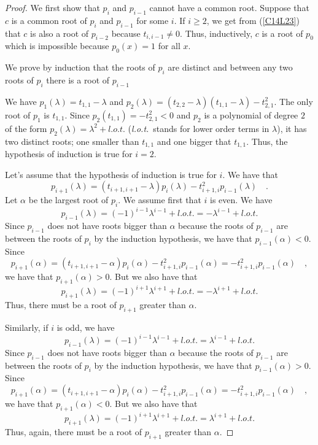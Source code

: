 \begin{proof}
 We first show that $p_i$ and $p_{i-1}$ cannot have a common
root.  Suppose that $c$ is a common root of $p_i$ and $p_{i-1}$ for
some $i$.  If $i\geq 2$, we get from (\ref{C14L23}) that $c$ is
also a root of $p_{i-2}$ because $t_{i,i-1} \neq 0$.  Thus,
inductively, $c$ is a root of $p_0$ which is impossible because
$p_0(x) = 1$ for all $x$.

 We prove by induction that the roots of $p_i$ are distinct
and between any two roots of $p_i$ there is a root of $p_{i-1}$

We have $p_1(\lambda) = t_{1,1} - \lambda$ and
$p_2(\lambda) = (t_{2,2}-\lambda)(t_{1,1}-\lambda) - t_{2,1}^2$.
The only root of $p_1$ is $t_{1,1}$.  Since
$p_2(t_{1,1}) = - t_{2,1}^2 < 0$ and $p_2$ is a polynomial of degree
$2$ of the form $p_2(\lambda) = \lambda^2 + l.o.t.$ ({\it l.o.t.}\
stands for lower order terms in $\lambda$), it has two distinct roots;
one smaller than $t_{1,1}$ and one bigger that $t_{1,1}$.   Thus, the
hypothesis of induction is true for $i=2$.

Let's assume that the hypothesis of induction is true for $i$.  We
have that
\[
  p_{i+1}(\lambda) = (t_{i+1,i+1}-\lambda) p_i(\lambda)
  - t_{i+1,i}^2 p_{i-1}(\lambda) \quad .
\]
Let $\alpha$ be the largest root of $p_i$.  We assume first that $i$
is even.  We have
\[
  p_{i-1}(\lambda) = (-1)^{i-1}\lambda^{i-1} + l.o.t.
  = - \lambda^{i-1} + l.o.t.
\]
Since $p_{i-1}$ does not have roots bigger than $\alpha$ because the
roots of $p_{i-1}$ are between the roots of $p_i$ by the induction
hypothesis, we have that $p_{i-1}(\alpha)< 0$.
Since
\[
  p_{i+1}(\alpha) = (t_{i+1,i+1}-\alpha) p_i(\alpha)
  - t_{i+1,i}^2 p_{i-1}(\alpha) = - t_{i+1,i}^2 p_{i-1}(\alpha) \quad ,
\]
we have that $p_{i+1}(\alpha)> 0$.  But we also have that
\[
  p_{i+1}(\lambda) = (-1)^{i+1}\lambda^{i+1} + l.o.t.
  = - \lambda^{i+1} + l.o.t.
\]
Thus, there must be a root of $p_{i+1}$ greater than $\alpha$.

Similarly, if $i$ is odd, we have
\[
  p_{i-1}(\lambda) = (-1)^{i-1}\lambda^{i-1} + l.o.t.
  = \lambda^{i-1} + l.o.t.
\]
Since $p_{i-1}$ does not have roots bigger than $\alpha$ because the
roots of $p_{i-1}$ are between the roots of $p_i$ by the induction
hypothesis, we have that $p_{i-1}(\alpha)> 0$.
Since
\[
  p_{i+1}(\alpha) = (t_{i+1,i+1}-\alpha) p_i(\alpha)
  - t_{i+1,i}^2 p_{i-1}(\alpha) = - t_{i+1,i}^2 p_{i-1}(\alpha) \quad ,
\]
we have that $p_{i+1}(\alpha)< 0$.  But we also have that
\[
  p_{i+1}(\lambda) = (-1)^{i+1}\lambda^{i+1} + l.o.t.
  = \lambda^{i+1} + l.o.t.
\]
Thus, again, there must be a root of $p_{i+1}$ greater than $\alpha$.


\end{proof}
